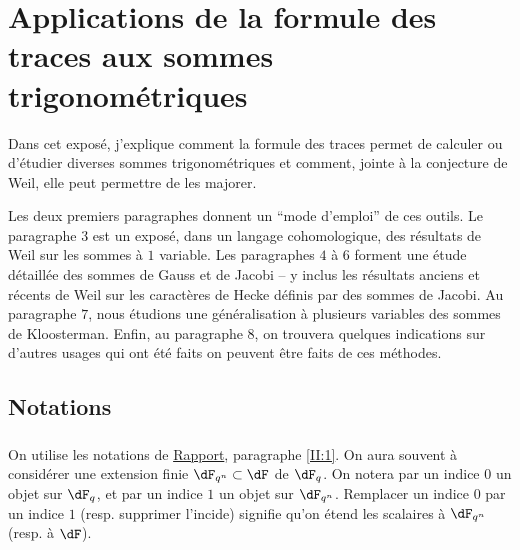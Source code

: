 
\chapter{Applications de la formule des traces aux sommes trigonométriques}\label{VI}










Dans cet exposé, j'explique comment la formule des traces permet de calculer 
ou d'étudier diverses sommes trigonométriques et comment, jointe à la 
conjecture de Weil, elle peut permettre de les majorer.

Les deux premiers paragraphes donnent un ``mode d'emploi'' de ces outils. Le 
paragraphe 3 est un exposé, dans un langage cohomologique, des résultats de 
Weil sur les sommes à $1$ variable. Les paragraphes $4$ à $6$ forment une 
étude détaillée des sommes de Gauss et de Jacobi -- y inclus les 
résultats anciens et récents de Weil sur les caractères de Hecke 
définis par des sommes de Jacobi. Au paragraphe $7$, nous étudions une 
généralisation à plusieurs variables des sommes de Kloosterman. Enfin, au 
paragraphe $8$, on trouvera quelques indications sur d'autres usages qui ont 
été faits on peuvent être faits de ces méthodes. 










\section*{Notations}\label{VI:0}





\subsection{}\label{VI:0-1}

On utilise les notations de \hyperref[II]{Rapport}, paragraphe \ref{II:1}. On 
aura souvent à considérer une extension finie $\dF_{q^n}\subset \dF$ de 
$\dF_q$. On notera par un indice $0$ un objet sur $\dF_q$, et par un indice $1$ 
un objet sur $\dF_{q^n}$. Remplacer un indice $0$ par un indice $1$ (resp. 
supprimer l'incide) signifie qu'on étend les scalaires à $\dF_{q^n}$ (resp. 
à $\dF$).





